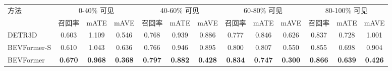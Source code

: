\begin{tabular}{l |c c c|c c c| c c c |c c c }
\toprule
\multirow{2}{*}{方法} & \multicolumn{3}{c|}{0-40\% 可见} & \multicolumn{3}{c|}{40-60\% 可见} & \multicolumn{3}{c|}{60-80\% 可见}&\multicolumn{3}{c}{80-100\% 可见} \\

	& 召回率 &mATE &mAVE& 召回率 &mATE &mAVE& 召回率 &mATE &mAVE& 召回率 &mATE &mAVE\\
\midrule
DETR3D & 0.603 & 1.109 & 0.546 & 0.768 & 0.939 &0.886 & 0.777 & 0.846 &0.626 &0.837 &0.728 &1.001\\
\rowcolor{gray95}
BEVFormer-S & 0.610 & 1.043 & 0.636 & 0.766 &0.946&0.895 &0.800 & 0.807 &0.550 &0.855 & 0.698 &0.904\\
\rowcolor{gray9}
BEVFormer &\textbf{0.670} & \textbf{0.968} &\textbf{0.368} &\textbf{0.797} & \textbf{0.882} &\textbf{0.428} &\textbf{0.834}&\textbf{0.747} &\textbf{0.300} &\textbf{0.866} &\textbf{0.639} &\textbf{0.426}\\
\bottomrule

\end{tabular}